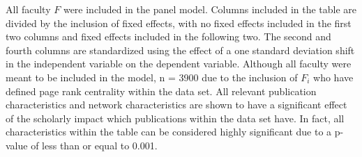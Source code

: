 \documentclass[10pt]{article}          %
\begin{document}
All faculty $F$ were included in the panel model. Columns included in the table are divided by the inclusion of fixed effects, with no fixed effects included in the first two columns and fixed effects included in the following two. The second and fourth columns are standardized using the effect of a one standard deviation shift in the independent variable on the dependent variable. Although all faculty were meant to be included in the model, n = 3900 due to the inclusion of $F_i$ who have defined page rank centrality within the data set. All relevant publication characteristics and network characteristics are shown to have a significant effect of the scholarly impact which publications within the data set have. In fact, all characteristics within the table can be considered highly significant due to a p-value of less than or equal to 0.001.   

\newpage
\end{document}
